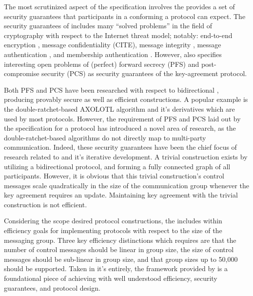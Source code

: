 The most scrutinized aspect of the  specification involves the provides a set of security guarantees that participants in a conforming a protocol can expect.
The security guarantees of  includes many ``solved problems'' in the field of cryptography with respect to the Internet threat model; notably: end-to-end encryption \autocite{padlipsky1978limitations}, message confidentiality (CITE), message integrity \autocite{voydock1983security}, message authentication \autocite{jueneman1983message}, and membership authentication \autocite{chaum1985showing}.
However,  also specifies interesting open problems of (perfect) forward secrecy (PFS) \autocite{gunther1989identity} and post-compromise security (PCS) \autocite{cohn2016post} as security guarantees of the key-agreement protocol.

Both PFS and PCS have been researched with respect to bidirectional , producing provably secure as well as efficient constructions.
A popular example is the double-ratchet-based AXOLOTL algorithm \autocite{perrin2014axolotl} and it's derivatives which are used by most  protocols.
However, the requirement of PFS and PCS laid out by the  specification for a  protocol has introduced a novel area of research, as the double-ratchet-based algorithms do not directly map to multi-party communication.
Indeed, these  security guarantees have been the chief focus of research related to  and it's iterative development.
A trivial construction exists by utilizing a bidirectional  protocol, and forming a fully connected graph of all  participants.
However, it is obvious that this trivial construction's control messages scale quadratically in the size of the communication group whenever the key agreement requires an update.
Maintaining key agreement with the trivial construction is not efficient.

Considering the scope desired protocol constructions, the  includes within  efficiency goals \autocite{ietf-mls-architecture-07} for implementing protocols with respect to the size of the messaging group.
Three key efficiency distinctions which  requires are that the number of control messages should be linear in group size, the size of control messages should be sub-linear in group size, and that group sizes up to 50,000 should be supported.
Taken in it's entirely, the framework provided by  is a foundational piece of achieving  with well understood efficiency, security guarantees, and protocol design.


